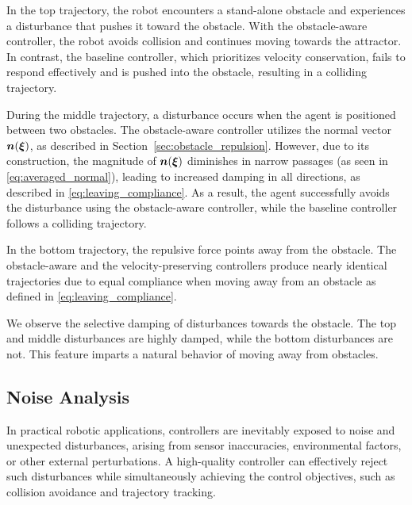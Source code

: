In the top trajectory, the robot encounters a stand-alone obstacle and experiences a disturbance that pushes it toward the obstacle. With the obstacle-aware controller, the robot avoids collision and continues moving towards the attractor. In contrast, the baseline controller, which prioritizes velocity conservation, fails to respond effectively and is pushed into the obstacle, resulting in a colliding trajectory.

During the middle trajectory, a disturbance occurs when the agent is positioned between two obstacles. The obstacle-aware controller utilizes the normal vector $\boldsymbol{n}(\boldsymbol{\xi})$, as described in Section~\ref{sec:obstacle_repulsion}. However, due to its construction, the magnitude of $\boldsymbol{n}(\boldsymbol{\xi})$ diminishes in narrow passages (as seen in \eqref{eq:averaged_normal}), leading to increased damping in all directions, as described in \eqref{eq:leaving_compliance}. As a result, the agent successfully avoids the disturbance using the obstacle-aware controller, while the baseline controller follows a colliding trajectory.

In the bottom trajectory, the repulsive force points away from the obstacle. The obstacle-aware and the velocity-preserving controllers produce nearly identical trajectories due to equal compliance when moving away from an obstacle as defined in \eqref{eq:leaving_compliance}.

We observe the selective damping of disturbances towards the obstacle. The top and middle disturbances are highly damped, while the bottom disturbances are not. This feature imparts a natural behavior of moving away from obstacles.

\subsection{Noise Analysis}
In practical robotic applications, controllers are inevitably exposed to noise and unexpected disturbances, arising from sensor inaccuracies, environmental factors, or other external perturbations. A high-quality controller can effectively reject such disturbances while simultaneously achieving the control objectives, such as collision avoidance and trajectory tracking.

